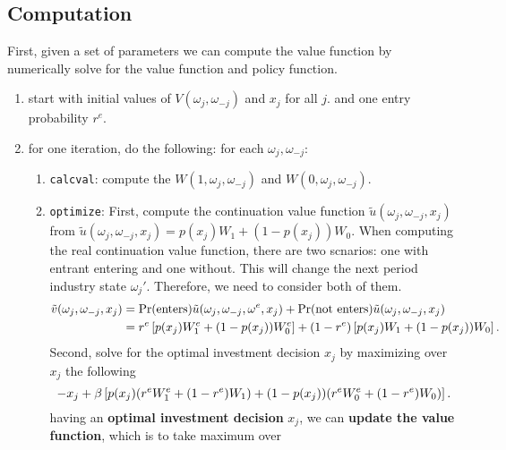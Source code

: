 \documentclass[12pt]{article}[margin=1in]
\begin{document}
\subsection{Computation}
First, given a set of parameters we can compute the value function by numerically solve for the value function and policy function.
\begin{enumerate}
    \item start with initial values of $V(\omega_j, \omega_{-j})$ and $x_j$ for all $j$. and one entry probability $r^e$.
    \item for one iteration, do the following:
          for each $\omega_j, \omega_{-j}$:
          \begin{enumerate}
              \item \verb|calcval|: compute the $W(1, \omega_j,\omega_{-j})$ and $W(0, \omega_j,\omega_{-j})$.
              \item  \verb|optimize|: First, compute the continuation value function $\tilde{u}(\omega_j, \omega_{-j}, x_j)$ from $\tilde{u}(\omega_j, \omega_{-j}, x_j)= p(x_j)W_1+(1-p(x_j))W_0$. When computing the real continuation value function, there are two scnarios: one with entrant entering and one without. This will change the next period industry state $\omega_j'$. Therefore, we need to consider both of them.
                    \begin{equation*}
                        \begin{split}
                            \tilde{v}(\omega_j, \omega_{-j}, x_j) & =\Pr(\text{enters})\tilde{u}(\omega_j, \omega_{-j}, \omega^e, x_j)
                            +\Pr(\text{not enters})\tilde{u}(\omega_j, \omega_{-j}, x_j)                                                         \\
                                                                  & = r^e\left[p(x_j)W_1^e+(1-p(x_j))W_0^e\right]+(1-r^e)\left[p(x_j)W_1+(1-p(x_j))W_0\right].
                        \end{split}
                    \end{equation*}
                    Second, solve for the optimal investment decision $x_j$ by maximizing over $x_j$ the following
                    \begin{equation*}
                        -x_j + \beta\left[p(x_j)(r^eW^e_1+(1-r^e)W_1)+(1-p(x_j))(r^eW_0^e+(1-r^e)W_0)\right].
                    \end{equation*}
                    having an \textbf{optimal investment decision} $x_j$, we can \textbf{update the value function}, which is to take maximum over

\end{enumerate}
\end{enumerate}
\end{document}
